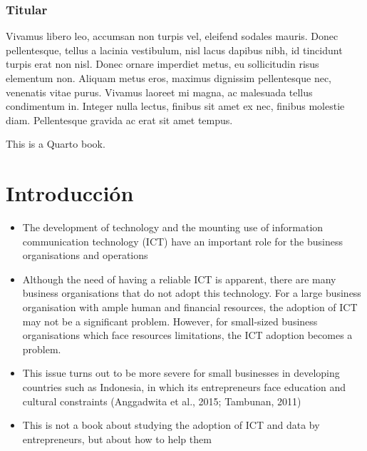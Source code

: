 \documentclass[
  letterpaper,
  DIV=11,
  numbers=noendperiod]{scrreprt}
\providecommand{\tightlist}{%
  \setlength{\itemsep}{0pt}\setlength{\parskip}{0pt}}\usepackage{longtable,booktabs,array}
\begin{document}
\hypertarget{titular-1}{%
\subsection*{Titular}\label{titular-1}}

Vivamus libero leo, accumsan non turpis vel, eleifend sodales mauris.
Donec pellentesque, tellus a lacinia vestibulum, nisl lacus dapibus
nibh, id tincidunt turpis erat non nisl. Donec ornare imperdiet metus,
eu sollicitudin risus elementum non. Aliquam metus eros, maximus
dignissim pellentesque nec, venenatis vitae purus. Vivamus laoreet mi
magna, ac malesuada tellus condimentum in. Integer nulla lectus, finibus
sit amet ex nec, finibus molestie diam. Pellentesque gravida ac erat sit
amet tempus.

This is a Quarto book.


\hypertarget{introducciuxf3n}{%
\chapter*{Introducción}\label{introducciuxf3n}}


\begin{itemize}
\tightlist
\item
  The development of technology and the mounting use of information
  communication technology (ICT) have an important role for the business
  organisations and operations
\item
  Although the need of having a reliable ICT is apparent, there are many
  business organisations that do not adopt this technology. For a large
  business organisation with ample human and financial resources, the
  adoption of ICT may not be a significant problem. However, for
  small-sized business organisations which face resources limitations,
  the ICT adoption becomes a problem.
\item
  This issue turns out to be more severe for small businesses in
  developing countries such as Indonesia, in which its entrepreneurs
  face education and cultural constraints (Anggadwita et al., 2015;
  Tambunan, 2011)
\item
  This is not a book about studying the adoption of ICT and data by
  entrepreneurs, but about how to help them
\end{itemize}
\end{document}
